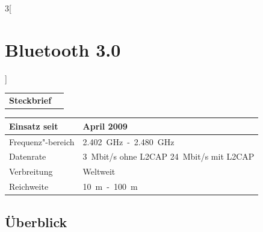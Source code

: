 \begin{multicols}{3}[\section{Bluetooth 3.0}]

\newrefsegment

\begin{boxedminipage}{\linewidth}
\begin{tabular}{p{}p{2.7 cm}}
\textbf{Steckbrief}& \\
\end{tabular}
\begin{tabular}{p{}|p{3.3 cm}}
      Einsatz seit & April 2009\\
      \hline
      Frequenz"-bereich  & \SI{2,402}{\giga\hertz}~-~\SI{2,480}{\giga\hertz}\\
      \hline
      Datenrate & \SI{3}{Mbit/s} ohne L2CAP \SI{24}{Mbit/s} mit L2CAP\\
      \hline
      Verbreitung & Weltweit\\
      \hline
      Reichweite & \SI{10}{\metre}~-~\SI{100}{\metre}\\
\end{tabular}
\end{boxedminipage}
\par
\subsection*{Überblick}


\end{multicols}
